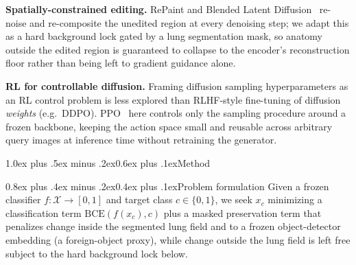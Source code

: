 \documentclass[10pt,twocolumn]{article}
\makeatletter
\renewcommand\section{\@startsection{section}{1}{\z@}%
  {1.0ex plus .5ex minus .2ex}{0.6ex plus .1ex}{\normalfont\large\bfseries}}
\renewcommand\subsection{\@startsection{subsection}{2}{\z@}%
  {0.8ex plus .4ex minus .2ex}{0.4ex plus .1ex}{\normalfont\normalsize\bfseries}}
\makeatother
\begin{document}
\textbf{Spatially-constrained editing.} RePaint and Blended Latent
Diffusion~\cite{repaint,blended} re-noise and re-composite the unedited
region at every denoising step; we adapt this as a hard background lock
gated by a lung segmentation mask, so anatomy outside the edited region
is guaranteed to collapse to the encoder's reconstruction floor rather
than being left to gradient guidance alone.

\textbf{RL for controllable diffusion.} Framing diffusion sampling
hyperparameters as an RL control problem is less explored than RLHF-style
fine-tuning of diffusion \emph{weights} (e.g.\ DDPO). PPO~\cite{schulman2017ppo}
here controls only the sampling procedure around a frozen backbone,
keeping the action space small and reusable across arbitrary query
images at inference time without retraining the generator.

\section{Method}
\label{sec:method}

\subsection{Problem formulation}
Given a frozen classifier $f:\mathcal{X}\to[0,1]$ and target class
$c\in\{0,1\}$, we seek $x_c$ minimizing a classification term
$\mathrm{BCE}(f(x_c),c)$ plus a masked preservation term that penalizes
change inside the segmented lung field and to a frozen object-detector
embedding (a foreign-object proxy), while change outside the lung field
is left free subject to the hard background lock below.
\end{document}
